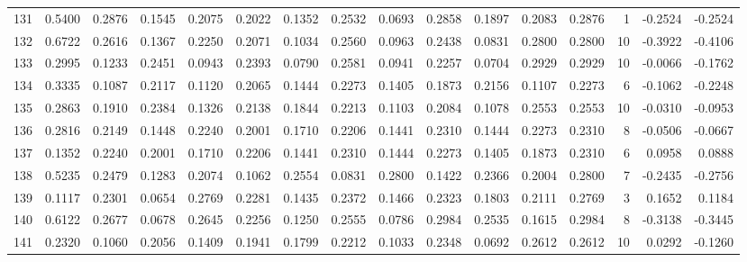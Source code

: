\begin{tabular}{lrrrrrrrrrrrrrrr}
131 &      0.5400 &  0.2876 &  0.1545 &  0.2075 &  0.2022 &  0.1352 &  0.2532 &  0.0693 &  0.2858 &  0.1897 &   0.2083 &     0.2876 &      1 &                   -0.2524 &                    -0.2524 \\
132 &      0.6722 &  0.2616 &  0.1367 &  0.2250 &  0.2071 &  0.1034 &  0.2560 &  0.0963 &  0.2438 &  0.0831 &   0.2800 &     0.2800 &     10 &                   -0.3922 &                    -0.4106 \\
133 &      0.2995 &  0.1233 &  0.2451 &  0.0943 &  0.2393 &  0.0790 &  0.2581 &  0.0941 &  0.2257 &  0.0704 &   0.2929 &     0.2929 &     10 &                   -0.0066 &                    -0.1762 \\
134 &      0.3335 &  0.1087 &  0.2117 &  0.1120 &  0.2065 &  0.1444 &  0.2273 &  0.1405 &  0.1873 &  0.2156 &   0.1107 &     0.2273 &      6 &                   -0.1062 &                    -0.2248 \\
135 &      0.2863 &  0.1910 &  0.2384 &  0.1326 &  0.2138 &  0.1844 &  0.2213 &  0.1103 &  0.2084 &  0.1078 &   0.2553 &     0.2553 &     10 &                   -0.0310 &                    -0.0953 \\
136 &      0.2816 &  0.2149 &  0.1448 &  0.2240 &  0.2001 &  0.1710 &  0.2206 &  0.1441 &  0.2310 &  0.1444 &   0.2273 &     0.2310 &      8 &                   -0.0506 &                    -0.0667 \\
137 &      0.1352 &  0.2240 &  0.2001 &  0.1710 &  0.2206 &  0.1441 &  0.2310 &  0.1444 &  0.2273 &  0.1405 &   0.1873 &     0.2310 &      6 &                    0.0958 &                     0.0888 \\
138 &      0.5235 &  0.2479 &  0.1283 &  0.2074 &  0.1062 &  0.2554 &  0.0831 &  0.2800 &  0.1422 &  0.2366 &   0.2004 &     0.2800 &      7 &                   -0.2435 &                    -0.2756 \\
139 &      0.1117 &  0.2301 &  0.0654 &  0.2769 &  0.2281 &  0.1435 &  0.2372 &  0.1466 &  0.2323 &  0.1803 &   0.2111 &     0.2769 &      3 &                    0.1652 &                     0.1184 \\
140 &      0.6122 &  0.2677 &  0.0678 &  0.2645 &  0.2256 &  0.1250 &  0.2555 &  0.0786 &  0.2984 &  0.2535 &   0.1615 &     0.2984 &      8 &                   -0.3138 &                    -0.3445 \\
141 &      0.2320 &  0.1060 &  0.2056 &  0.1409 &  0.1941 &  0.1799 &  0.2212 &  0.1033 &  0.2348 &  0.0692 &   0.2612 &     0.2612 &     10 &                    0.0292 &                    -0.1260 \\

\end{tabular}
